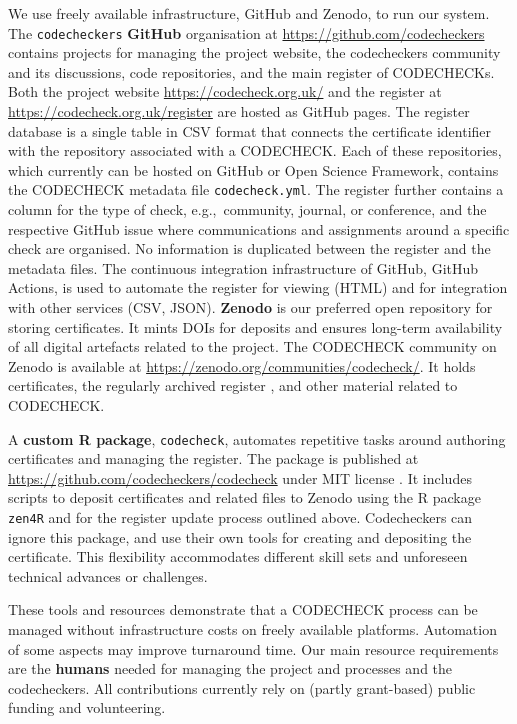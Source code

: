 \documentclass[12pt]{article}
\begin{document}
We use freely available infrastructure, GitHub and Zenodo, to run our
system.  The \texttt{codecheckers} \textbf{GitHub} organisation at
\url{https://github.com/codecheckers} contains projects for managing
the project website, the codecheckers community and its discussions,
code repositories, and the main register of CODECHECKs. Both the
project website \url{https://codecheck.org.uk/} and the register at
\url{https://codecheck.org.uk/register} are hosted as GitHub pages.
The register database is a single table in CSV format that connects
the certificate identifier with the repository associated with a
CODECHECK. Each of these repositories, which currently can be hosted
on GitHub or Open Science Framework, contains the CODECHECK
metadata file \texttt{codecheck.yml}. The register further contains a
column for the type of check, e.g.,~community, journal, or conference,
and the respective GitHub issue where communications and assignments
around a specific check are organised. No information is duplicated
between the register and the metadata files. The continuous
integration infrastructure of GitHub, GitHub Actions, is used to
automate the register for viewing (HTML) and for integration with
other services (CSV, JSON).  \textbf{Zenodo} is our preferred open
repository for storing certificates. It mints DOIs for deposits and
ensures long-term availability of all digital artefacts related to the
project. The CODECHECK community on Zenodo is available at
\url{https://zenodo.org/communities/codecheck/}. It holds
certificates, the regularly archived register
\cite{codecheck_register_jan2021}, and other material related to
CODECHECK.

A \textbf{custom R package}, \texttt{codecheck}, automates
repetitive tasks around authoring certificates and managing the
register. The package is published at
\url{https://github.com/codecheckers/codecheck} under MIT license
\cite{stephen_eglen_codecheckerscodecheck_2021}.
It includes scripts to deposit certificates and related
files to Zenodo using the R package \texttt{zen4R} \cite{zen4r} and
for the register update process outlined above.  Codecheckers can
ignore this package, and use their own tools for creating
and depositing the certificate.  This flexibility  accommodates
different skill sets and unforeseen technical advances or challenges.

These tools and resources demonstrate that a CODECHECK process can be
managed without infrastructure costs on freely available platforms.
Automation of some aspects may improve turnaround time. Our main
resource requirements are the \textbf{humans} needed for managing the
project and processes and the codecheckers.  All contributions
currently rely on (partly grant-based) public funding and
volunteering.
\end{document}
